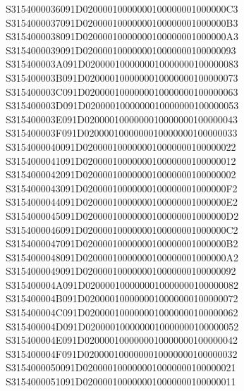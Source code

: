 \documentclass[12pt,a4paper]{article}
\begin{document}
\begin{framed}
{S3154000036091D02000010000000100000001000000C3\newline
S3154000037091D02000010000000100000001000000B3\newline
S3154000038091D02000010000000100000001000000A3\newline
S3154000039091D0200001000000010000000100000093\newline
S315400003A091D0200001000000010000000100000083\newline
S315400003B091D0200001000000010000000100000073\newline
S315400003C091D0200001000000010000000100000063\newline
S315400003D091D0200001000000010000000100000053\newline
S315400003E091D0200001000000010000000100000043\newline
S315400003F091D0200001000000010000000100000033\newline
S3154000040091D0200001000000010000000100000022\newline
S3154000041091D0200001000000010000000100000012\newline
S3154000042091D0200001000000010000000100000002\newline
S3154000043091D02000010000000100000001000000F2\newline
S3154000044091D02000010000000100000001000000E2\newline
S3154000045091D02000010000000100000001000000D2\newline
S3154000046091D02000010000000100000001000000C2\newline
S3154000047091D02000010000000100000001000000B2\newline
S3154000048091D02000010000000100000001000000A2\newline
S3154000049091D0200001000000010000000100000092\newline
S315400004A091D0200001000000010000000100000082\newline
S315400004B091D0200001000000010000000100000072\newline
S315400004C091D0200001000000010000000100000062\newline
S315400004D091D0200001000000010000000100000052\newline
S315400004E091D0200001000000010000000100000042\newline
S315400004F091D0200001000000010000000100000032\newline
S3154000050091D0200001000000010000000100000021\newline
S3154000051091D0200001000000010000000100000011\newline
}
\end{framed}
\end{document}
